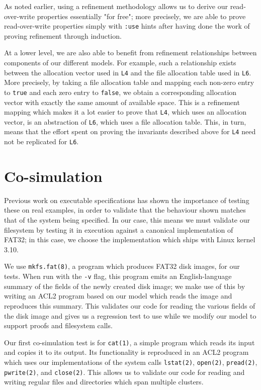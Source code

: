 \documentclass[submission,copyright,creativecommons]{eptcs}
\begin{document}
As noted earlier, using a refinement methodology allows us to derive
our read-over-write properties essentially "for free"; more precisely,
we are able to prove read-over-write properties simply with
\texttt{:use} hints after having done the work of proving refinement
through induction.

At a lower level, we are also able to benefit from refinement
relationships between components of our different models. For example,
such a relationship exists between the allocation vector used in
\texttt{L4} and the file allocation table used in \texttt{L6}. More
precisely, by taking a file allocation table and mapping each non-zero
entry to \texttt{true} and each zero entry to \texttt{false}, we
obtain a corresponding allocation vector with exactly the same amount
of available space. This is a refinement mapping which makes it a lot
easier to prove that \texttt{L4}, which uses an allocation vector, is
an abstraction of \texttt{L6}, which uses a file allocation
table. This, in turn, means that the effort spent on proving the
invariants described above for \texttt{L4} need not be replicated for
\texttt{L6}.

\section{Co-simulation}

Previous work on executable specifications \cite{goel2014simulation}
has shown the importance of testing these on real examples, in order
to validate that the behaviour shown matches that of the system being
specified. In our case, this means we must validate our filesystem by
testing it in execution against a canonical implementation of FAT32;
in this case, we choose the implementation which ships with Linux
kernel 3.10.

We use \texttt{mkfs.fat(8)}, a program which produces FAT32 disk
images, for our tests. When run with the \texttt{-v} flag, this
program emits an English-language summary of the fields of the newly
created disk image; we make use of this by writing an ACL2 program
based on our model which reads the image and reproduces this
summary. This validates our code for reading the various fields of the
disk image and gives us a regression test to use while we modify our
model to support proofs and filesystem calls.

Our first co-simulation test is for \texttt{cat(1)}, a simple program
which reads its input and copies it to its output. Its functionality
is reproduced in an ACL2 program which uses our implementations of the
system calls \texttt{lstat(2)}, \texttt{open(2)}, \texttt{pread(2)},
\texttt{pwrite(2)}, and \texttt{close(2)}. This allows us to validate
our code for reading and writing regular files and directories which
span multiple clusters.
\end{document}
